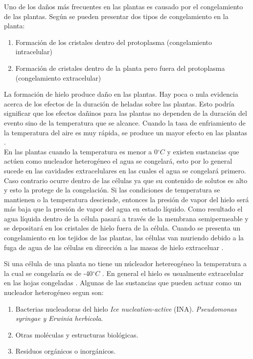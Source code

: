 \documentclass[11pt]{article}
\def\celc{$^{\circ}C$ }%
\begin{document}
Uno de los daños más frecuentes en las plantas es causado por el congelamiento de las plantas. Según \citet{Snyder2005} se pueden presentar dos tipos de congelamiento en la planta:

\begin{enumerate}
\item Formación de los cristales dentro del protoplasma (congelamiento intracelular)
\item Formación de cristales dentro de la planta pero fuera del protoplasma (congelamiento extracelular)
\end{enumerate}

La formación de hielo produce daño en las plantas. Hay poca o nula evidencia acerca de los efectos de la duración de heladas sobre las plantas. Esto podría significar que los efectos dañinos para las plantas no dependen de la duración del evento sino de la temperatura que se alcance. Cuando la tasa de enfriamiento de la temperatura del aire es muy rápida, se produce un mayor efecto en las plantas \citep{Snyder2010}.\\

En las plantas cuando la temperatura es menor a 0\celc y existen sustancias que actúen como nucleador heterogéneo el agua se congelará, esto por lo general sucede en las cavidades extracelulares en las cuales el agua se congelará primero. Caso contrario ocurre dentro de las células ya que su contenido de solutos es alto y esto la protege de la congelación. Si las condiciones de temperatura se mantienen o la temperatura desciende, entonces la presión de vapor del hielo será más baja que la presión de vapor del agua en estado líquido. Como resultado el agua líquida dentro de la célula pasará a través de la membrana semipermeable y se depositará en los cristales de hielo fuera de la célula. Cuando se presenta un congelamiento en los tejidos de las plantas, las células van muriendo debido a la fuga de agua de las células en dirección a las masas de hielo extraceluar \citep{levitt2012chilling, pearce2001plant}.


Si una célula de una planta no tiene un núcleador hetereogéneo la temperatura a la cual se congelaría es de -40\celc. En general el hielo es usualmente extracelular en las hojas congeladas \citep{pearce2001plant}. Algunas de las sustancias que pueden actuar como un nucleador heterogéneo segun \citet{pearce2001plant} son:
\begin{enumerate}
\item Bacterias nucleadoras del hielo \textit{Ice nucleation-active} (INA). \textit{Pseudomonas syringae y Erwinia herbicola}.
\item Otras moléculas y estructuras biológicas.
\item Residuos orgánicos o inorgánicos.
\end{enumerate}
\end{document}
